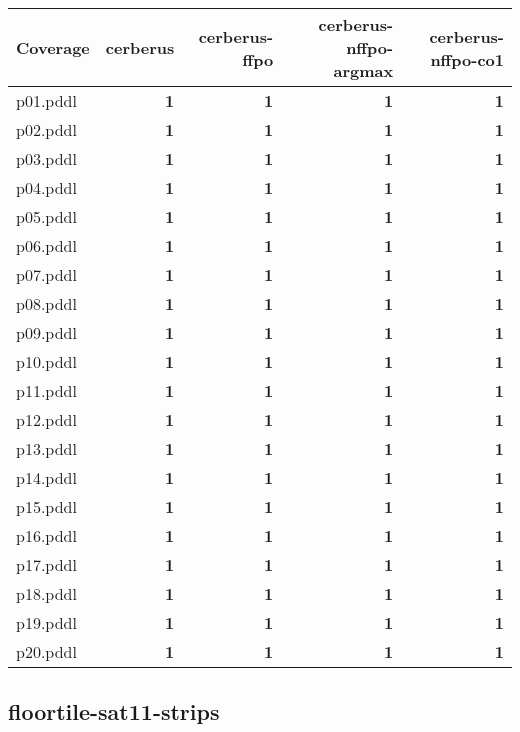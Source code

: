 \documentclass{article}
\begin{document}
\begin{tabular}{@{}lrrrr@{}}
Coverage & cerberus & cerberus-ffpo & cerberus-nffpo-argmax & cerberus-nffpo-co1 \\
\midrule
p01.pddl & \textbf{1} & \textbf{1} & \textbf{1} & \textbf{1} \\
p02.pddl & \textbf{1} & \textbf{1} & \textbf{1} & \textbf{1} \\
p03.pddl & \textbf{1} & \textbf{1} & \textbf{1} & \textbf{1} \\
p04.pddl & \textbf{1} & \textbf{1} & \textbf{1} & \textbf{1} \\
p05.pddl & \textbf{1} & \textbf{1} & \textbf{1} & \textbf{1} \\
p06.pddl & \textbf{1} & \textbf{1} & \textbf{1} & \textbf{1} \\
p07.pddl & \textbf{1} & \textbf{1} & \textbf{1} & \textbf{1} \\
p08.pddl & \textbf{1} & \textbf{1} & \textbf{1} & \textbf{1} \\
p09.pddl & \textbf{1} & \textbf{1} & \textbf{1} & \textbf{1} \\
p10.pddl & \textbf{1} & \textbf{1} & \textbf{1} & \textbf{1} \\
p11.pddl & \textbf{1} & \textbf{1} & \textbf{1} & \textbf{1} \\
p12.pddl & \textbf{1} & \textbf{1} & \textbf{1} & \textbf{1} \\
p13.pddl & \textbf{1} & \textbf{1} & \textbf{1} & \textbf{1} \\
p14.pddl & \textbf{1} & \textbf{1} & \textbf{1} & \textbf{1} \\
p15.pddl & \textbf{1} & \textbf{1} & \textbf{1} & \textbf{1} \\
p16.pddl & \textbf{1} & \textbf{1} & \textbf{1} & \textbf{1} \\
p17.pddl & \textbf{1} & \textbf{1} & \textbf{1} & \textbf{1} \\
p18.pddl & \textbf{1} & \textbf{1} & \textbf{1} & \textbf{1} \\
p19.pddl & \textbf{1} & \textbf{1} & \textbf{1} & \textbf{1} \\
p20.pddl & \textbf{1} & \textbf{1} & \textbf{1} & \textbf{1} \\
\end{tabular}

\hypertarget{coverage-floortile-sat11-strips}{}
\subsection*{floortile-sat11-strips}
\end{document}
